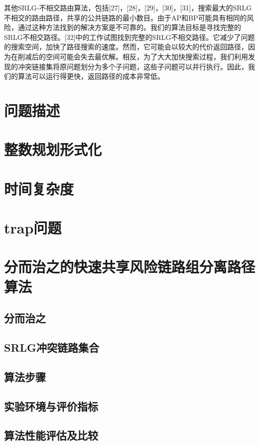 其他SRLG-不相交路由算法，包括[27]，[28]，[29]，[30]，[31]，搜索最大的SRLG不相交的路由路径，共享的公共链路的最小数目。由于AP和BP可能具有相同的风险，通过这种方法找到的解决方案是不可靠的。我们的算法目标是寻找完整的SRLG不相交路径。[32]中的工作试图找到完整的SRLG不相交路径。它减少了问题的搜索空间，加快了路径搜索的速度。然而，它可能会以较大的代价返回路径，因为在削减后的空间可能会失去最优解。相反，为了大大加快搜索过程，我们利用发现的冲突链接集将原问题划分为多个子问题，这些子问题可以并行执行。因此，我们的算法可以运行得更快，返回路径的成本非常低。

\section{问题描述}
\section{整数规划形式化}
\section{时间复杂度}

\section{trap问题}

\section{分而治之的快速共享风险链路组分离路径算法}
\subsection{分而治之}
\subsection{SRLG冲突链路集合}
\subsection{算法步骤}
\subsection{实验环境与评价指标}
\subsection{算法性能评估及比较}
